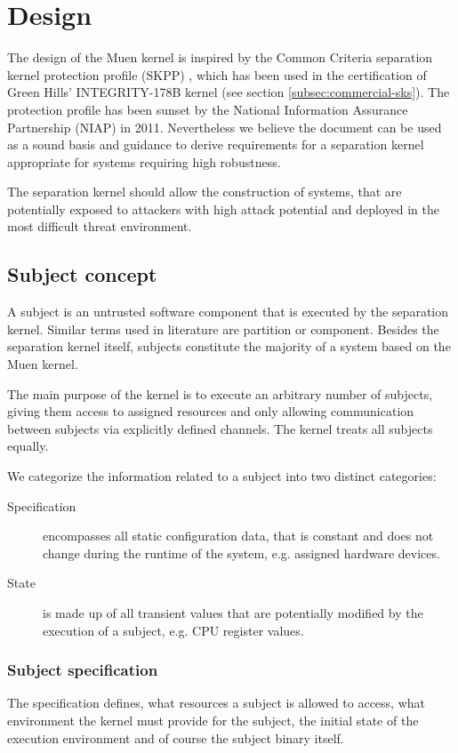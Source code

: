 \chapter{Design}
The design of the Muen kernel is inspired by the Common Criteria separation
kernel protection profile (SKPP) \cite{SKPP}, which has been used in the
certification of Green Hills' INTEGRITY-178B kernel (see section
\ref{subsec:commercial-sks}). The protection profile has been sunset by the
National Information Assurance Partnership (NIAP) in 2011. Nevertheless we
believe the document can be used as a sound basis and guidance to derive
requirements for a separation kernel appropriate for systems requiring high
robustness.

The separation kernel should allow the construction of systems, that are
potentially exposed to attackers with high attack potential and deployed in the
most difficult threat environment.





\section{Subject concept}
A subject is an untrusted software component that is executed by the separation
kernel. Similar terms used in literature are partition or component. Besides the
separation kernel itself, subjects constitute the majority of a system based on
the Muen kernel.

The main purpose of the kernel is to execute an arbitrary number of subjects,
giving them access to assigned resources and only allowing communication between
subjects via explicitly defined channels. The kernel treats all subjects equally.

We categorize the information related to a subject into two distinct categories:

\begin{description}
	\item[Specification] encompasses all static configuration data, that is
		constant and does not change during the runtime of the system, e.g.
		assigned hardware devices.
	\item[State] is made up of all transient values that are potentially modified
		by the execution of a subject, e.g. CPU register values.
\end{description}

\subsection{Subject specification}
The specification defines, what resources a subject is allowed to access, what
environment the kernel must provide for the subject, the initial state of the
execution environment and of course the subject binary itself.

